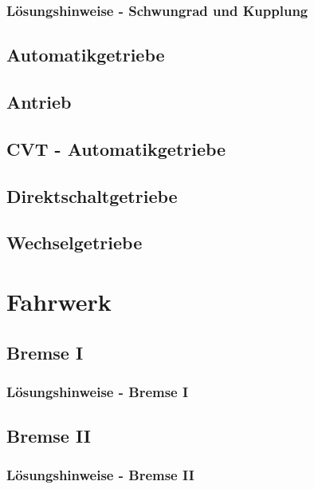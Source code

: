 \section{Lösungshinweise - Schwungrad und Kupplung}
 
\chapter{Automatikgetriebe}
 \newpage
\chapter{Antrieb}
 \newpage
\chapter{CVT - Automatikgetriebe}
 \newpage
\chapter{Direktschaltgetriebe}
 \newpage
\chapter{Wechselgetriebe}
 \newpage


\part{Fahrwerk}
\chapter{Bremse I}
 \newpage
\section{Lösungshinweise - Bremse I}
 \newpage

\chapter{Bremse II}
 \newpage
\section{Lösungshinweise - Bremse II}
 \newpage

